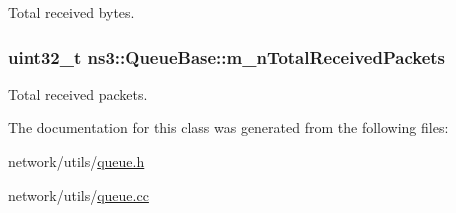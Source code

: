 Total received bytes. 

\subsubsection[{\texorpdfstring{m\+\_\+n\+Total\+Received\+Packets}{m_nTotalReceivedPackets}}]{\setlength{\rightskip}{0pt plus 5cm}uint32\+\_\+t ns3\+::\+Queue\+Base\+::m\+\_\+n\+Total\+Received\+Packets\hspace{0.3cm}{\ttfamily [private]}}\hypertarget{classns3_1_1QueueBase_a38f86662dd25be4c5a91eb6d23af42ea}{}\label{classns3_1_1QueueBase_a38f86662dd25be4c5a91eb6d23af42ea}


Total received packets. 



The documentation for this class was generated from the following files\+:\begin{DoxyCompactItemize}
\item 
network/utils/\hyperlink{queue_8h}{queue.\+h}\item 
network/utils/\hyperlink{queue_8cc}{queue.\+cc}\end{DoxyCompactItemize}
